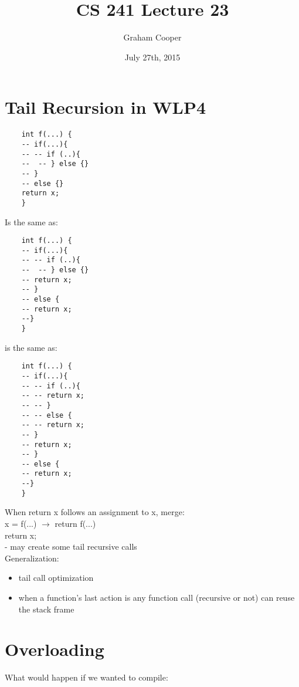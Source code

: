 \documentclass[12pt]{article}
\title{\vspace{-15ex}CS 241 Lecture 23\vspace{-1ex}}
\date{July 27th, 2015}
\author{Graham Cooper}
\begin{document}
	\maketitle
	
	\section{Tail Recursion in WLP4}
	
	\begin{verbatim}
	int f(...) {
	-- if(...){
	-- -- if (..){	
	--	-- } else {}
	-- } 
	-- else {}
	return x;
	}
	\end{verbatim}
	
	Is the same as:\\
	
	\begin{verbatim}
	int f(...) {
	-- if(...){
	-- -- if (..){	
	--	-- } else {}
	-- return x;
	-- } 
	-- else {
	-- return x;
	--}
	}
	\end{verbatim}
	
	is the same as:\\
	\begin{verbatim}
	int f(...) {
	-- if(...){
	-- -- if (..){	
	-- -- return x; 
	-- -- } 
	-- -- else {
	-- -- return x;
	-- }
	-- return x;
	-- } 
	-- else {
	-- return x;
	--}
	}
	\end{verbatim}
	
	When return x follows an assignment to x, merge:\\
	x = f(...) $\rightarrow$ return f(...)\\
	return x;\\
	
	- may create some tail recursive calls\\
	
	Generalization:\\
	\begin{itemize}
		\item tail call optimization
		\item when a function's last action is any function call (recursive or not) can reuse the stack frame\\
	\end{itemize}
	
	\section*{Overloading}
	What would happen if we wanted to compile:\\
	
\end{document}
